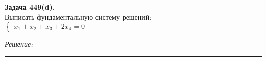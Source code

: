 \documentclass[a4paper, 12pt]{article}
\newenvironment{problem}[2][Задача]
{ \begin{mdframed}[backgroundcolor=gray!10] \textbf{#1 #2.} \\}
{  \end{mdframed}}
\newenvironment{solution}
{\textit{Решение: }}
{\noindent\rule{7in}{1.5pt}}
\begin{document}
\begin{problem}{449(d)}
  Выписать фундаментальную систему решений:\\
  $\left\{\begin{array}{l}
      x_1+x_2+x_3+2x_4=0
  \end{array}\right.$

\end{problem}
\begin{solution}

\end{solution}

\end{document}
